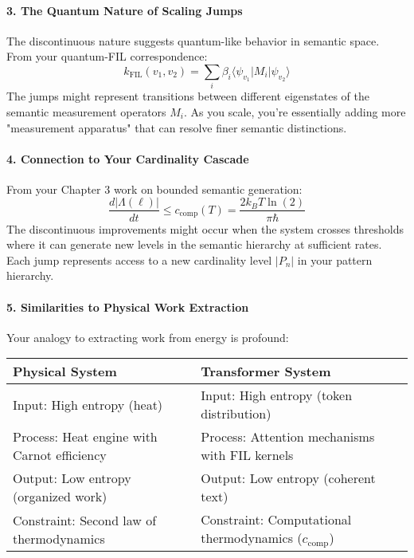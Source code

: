 \documentclass[11pt,letterpaper]{article}
\begin{document}
\paragraph{3. The Quantum Nature of Scaling Jumps}
The discontinuous nature suggests quantum-like behavior in semantic space. From your quantum-FIL correspondence:
\[
k_{\text{FIL}}(v_1, v_2) = \sum_i \beta_i \langle \psi_{v_1} | M_i | \psi_{v_2} \rangle
\]
The jumps might represent transitions between different eigenstates of the semantic measurement operators $M_i$. As you scale, you're essentially adding more "measurement apparatus" that can resolve finer semantic distinctions.

\paragraph{4. Connection to Your Cardinality Cascade}
From your Chapter 3 work on bounded semantic generation:
\[
\frac{d|\Lambda(\ell)|}{dt} \leq c_{\text{comp}}(T) = \frac{2k_B T \ln(2)}{\pi \hbar}
\]
The discontinuous improvements might occur when the system crosses thresholds where it can generate new levels in the semantic hierarchy at sufficient rates. Each jump represents access to a new cardinality level $|P_n|$ in your pattern hierarchy.

\paragraph{5. Similarities to Physical Work Extraction}
Your analogy to extracting work from energy is profound:
\begin{center}
\begin{tabular}{ll}
\toprule
\textbf{Physical System} & \textbf{Transformer System} \\
\midrule
Input: High entropy (heat) & Input: High entropy (token distribution) \\
Process: Heat engine with Carnot efficiency & Process: Attention mechanisms with FIL kernels \\
Output: Low entropy (organized work) & Output: Low entropy (coherent text) \\
Constraint: Second law of thermodynamics & Constraint: Computational thermodynamics ($c_{\text{comp}}$) \\
\bottomrule
\end{tabular}
\end{center}
\end{document}
